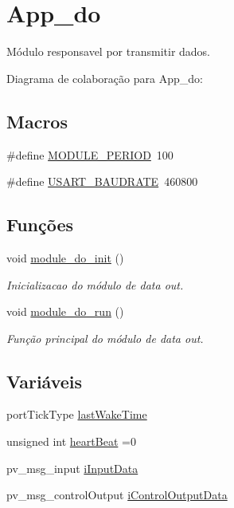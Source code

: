 \hypertarget{group__app__do}{\section{App\-\_\-do}
\label{group__app__do}
}


Módulo responsavel por transmitir dados.  


Diagrama de colaboração para App\-\_\-do\-:
\subsection*{Macros}
\begin{DoxyCompactItemize}
\item 
\#define \hyperlink{group__app__do_ga0ac6c9f2991b096e49c354e5cce6fae0}{M\-O\-D\-U\-L\-E\-\_\-\-P\-E\-R\-I\-O\-D}~100
\item 
\#define \hyperlink{group__app__do_ga6a53a6c94a70cc286e300a0ea8f46ba4}{U\-S\-A\-R\-T\-\_\-\-B\-A\-U\-D\-R\-A\-T\-E}~460800
\end{DoxyCompactItemize}
\subsection*{Funções}
\begin{DoxyCompactItemize}
\item 
void \hyperlink{group__app__do_ga901c023651503207f5cfd8cdb8c305b3}{module\-\_\-do\-\_\-init} ()
\begin{DoxyCompactList}\small\item\em Inicializacao do módulo de data out. \end{DoxyCompactList}\item 
void \hyperlink{group__app__do_ga1f08b4b431624465a47f47eca0520253}{module\-\_\-do\-\_\-run} ()
\begin{DoxyCompactList}\small\item\em Função principal do módulo de data out. \end{DoxyCompactList}\end{DoxyCompactItemize}
\subsection*{Variáveis}
\begin{DoxyCompactItemize}
\item 
port\-Tick\-Type \hyperlink{group__app__do_gaa8db3871cb5f64abbd94ddd5a1db73a6}{last\-Wake\-Time}
\item 
unsigned int \hyperlink{group__app__do_ga24475be702ffcc5a6f0a5557040368ef}{heart\-Beat} =0
\item 
pv\-\_\-msg\-\_\-input \hyperlink{group__app__do_gac40b8cfe5fd2000670ad57fe3e75ec89}{i\-Input\-Data}
\item 
pv\-\_\-msg\-\_\-control\-Output \hyperlink{group__app__do_gacabca53fbaffdbf13b8e5a1c29b73bc4}{i\-Control\-Output\-Data}
\end{DoxyCompactItemize}


